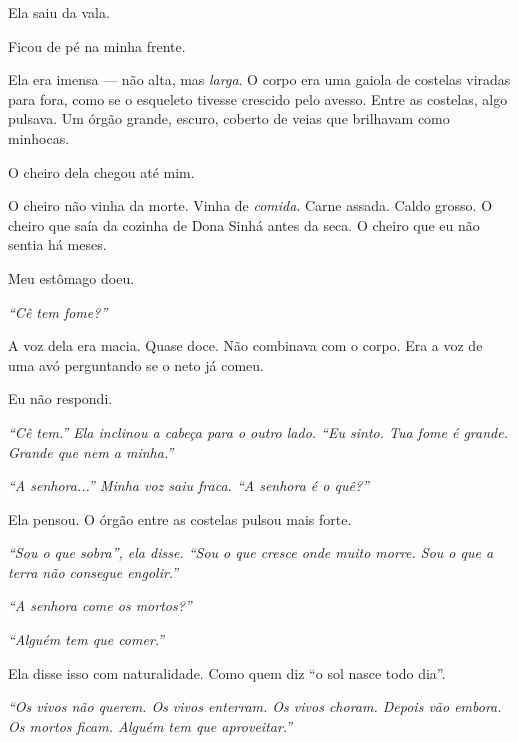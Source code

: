 \noindent Ela saiu da vala.

\noindent Ficou de pé na minha frente.

\noindent Ela era imensa --- não alta, mas \textit{larga}. O corpo era uma gaiola de costelas viradas para fora, como se o esqueleto tivesse crescido pelo avesso. Entre as costelas, algo pulsava. Um órgão grande, escuro, coberto de veias que brilhavam como minhocas.

\noindent O cheiro dela chegou até mim.

\noindent O cheiro não vinha da morte. Vinha de \textit{comida}. Carne assada. Caldo grosso. O cheiro que saía da cozinha de Dona Sinhá antes da seca. O cheiro que eu não sentia há meses.

\noindent Meu estômago doeu.

\noindent \textit{\textquotedblleft{}Cê tem fome?\textquotedblright{}}

\noindent A voz dela era macia. Quase doce. Não combinava com o corpo. Era a voz de uma avó perguntando se o neto já comeu.

\noindent Eu não respondi.

\noindent \textit{\textquotedblleft{}Cê tem.\textquotedblright{}\textit{ Ela inclinou a cabeça para o outro lado. }\textquotedblleft{}Eu sinto. Tua fome é grande. Grande que nem a minha.\textquotedblright{}}

\noindent \textit{\textquotedblleft{}A senhora...\textquotedblright{}\textit{ Minha voz saiu fraca. }\textquotedblleft{}A senhora é o quê?\textquotedblright{}}

\noindent Ela pensou. O órgão entre as costelas pulsou mais forte.

\noindent \textit{\textquotedblleft{}Sou o que sobra\textquotedblright{}\textit{, ela disse. }\textquotedblleft{}Sou o que cresce onde muito morre. Sou o que a terra não consegue engolir.\textquotedblright{}}

\noindent \textit{\textquotedblleft{}A senhora come os mortos?\textquotedblright{}}

\noindent \textit{\textquotedblleft{}Alguém tem que comer.\textquotedblright{}}

\noindent Ela disse isso com naturalidade. Como quem diz \textquotedblleft{}o sol nasce todo dia\textquotedblright{}.

\noindent \textit{\textquotedblleft{}Os vivos não querem. Os vivos enterram. Os vivos choram. Depois vão embora. Os mortos ficam. Alguém tem que aproveitar.\textquotedblright{}}

